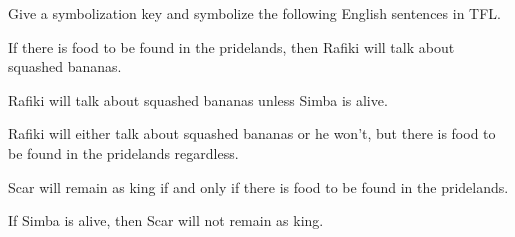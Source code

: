 \problempart Give a symbolization key and symbolize the following English sentences in TFL.
\begin{compactlist}
\item If there is food to be found in the pridelands, then Rafiki will talk about squashed bananas.
\item[] 
\item Rafiki will talk about squashed bananas unless Simba is alive.
\item[] 
\item Rafiki will either talk about squashed bananas or he won't, but there is food to be found in the pridelands regardless.
\item[] 
\item Scar will remain as king if and only if there is food to be found in the pridelands.
\item[] 
\item If Simba is alive, then Scar will not remain as king.
\item[] 
\end{compactlist}


